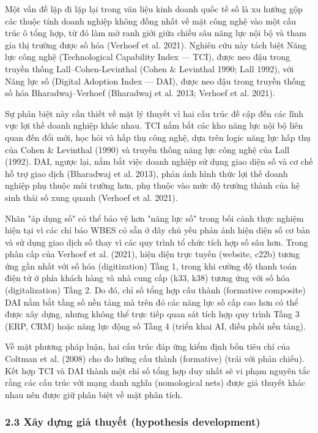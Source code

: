 \documentclass[12pt,a4paper]{article}
\begin{document}
Một vấn đề lặp đi lặp lại trong văn liệu kinh doanh quốc tế số là xu
hướng gộp các thuộc tính doanh nghiệp không đồng nhất về mặt công nghệ
vào một cấu trúc ô tổng hợp, từ đó làm mờ ranh giới giữa chiều sâu năng
lực nội bộ và tham gia thị trường được số hóa (Verhoef et al. 2021).
Nghiên cứu này tách biệt Năng lực công nghệ (Technological Capability
Index --- TCI), được neo đậu trong truyền thống Lall--Cohen-Levinthal
(Cohen \& Levinthal 1990; Lall 1992), với Năng lực số (Digital Adoption
Index --- DAI), được neo đậu trong truyền thống số hóa
Bharadwaj--Verhoef (Bharadwaj et al. 2013; Verhoef et al. 2021).

Sự phân biệt này cần thiết về mặt lý thuyết vì hai cấu trúc đề cập đến
các lĩnh vực lợi thế doanh nghiệp khác nhau. TCI nắm bắt các kho năng
lực nội bộ liên quan đến đổi mới, học hỏi và hấp thụ công nghệ, dựa trên
logic năng lực hấp thụ của Cohen \& Levinthal (1990) và truyền thống
năng lực công nghệ của Lall (1992). DAI, ngược lại, nắm bắt việc doanh
nghiệp sử dụng giao diện số và cơ chế hỗ trợ giao dịch (Bharadwaj et al.
2013), phản ánh hình thức lợi thế doanh nghiệp phụ thuộc môi trường hơn,
phụ thuộc vào mức độ trưởng thành của hệ sinh thái số xung quanh
(Verhoef et al. 2021).

Nhãn "áp dụng số" có thể bảo vệ hơn "năng lực số" trong bối cảnh thực
nghiệm hiện tại vì các chỉ báo WBES có sẵn ở đây chủ yếu phản ánh hiện
diện số cơ bản và sử dụng giao dịch số thay vì các quy trình tổ chức
tích hợp số sâu hơn. Trong phân cấp của Verhoef et al. (2021), hiện diện
trực tuyến (website, c22b) tương ứng gần nhất với số hóa (digitization)
Tầng 1, trong khi cường độ thanh toán điện tử ở phía khách hàng và nhà
cung cấp (k33, k38) tương ứng với số hóa (digitalization) Tầng 2. Do đó,
chỉ số tổng hợp cấu thành (formative composite) DAI nắm bắt tầng số nền
tảng mà trên đó các năng lực số cấp cao hơn có thể được xây dựng, nhưng
không thể trực tiếp quan sát tích hợp quy trình Tầng 3 (ERP, CRM) hoặc
năng lực động số Tầng 4 (triển khai AI, điều phối nền tảng).

Về mặt phương pháp luận, hai cấu trúc đáp ứng kiểm định bốn tiêu chí của
Coltman et al. (2008) cho đo lường cấu thành (formative) (trái với phản
chiếu). Kết hợp TCI và DAI thành một chỉ số tổng hợp duy nhất sẽ vi phạm
nguyên tắc rằng các cấu trúc với mạng danh nghĩa (nomological nets) được
giả thuyết khác nhau nên được giữ phân biệt về mặt phân tích.

\hypertarget{23-xuxe2y-dux1ef1ng-giux1ea3-thuyux1ebft-hypothesis-development}{%
\subsubsection{2.3 Xây dựng giả thuyết (hypothesis
development)}\label{23-xuxe2y-dux1ef1ng-giux1ea3-thuyux1ebft-hypothesis-development}}
\end{document}
